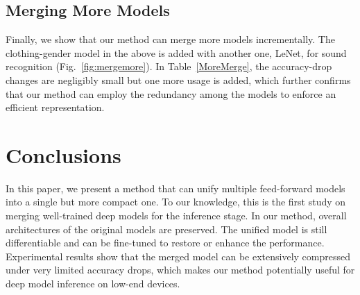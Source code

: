 \documentclass{article}
\begin{document}
	
	
	\subsection*{Merging More Models}
	Finally, we show that our method can merge more models incrementally.
	The clothing-gender model in the above is added with another one, LeNet, for sound recognition (Fig.~\ref{fig:mergemore}).
	In Table~\ref{MoreMerge}, the accuracy-drop changes are negligibly small %
	but one more usage is added, which further confirms that our method can employ the redundancy among the models to enforce an efficient representation.
	
	
	
	\section{Conclusions}
	In this paper, we present a method that can unify multiple feed-forward models into a single but more compact one.
	To our knowledge, this is the first study on merging well-trained deep models for the inference stage. In our method, overall architectures of the original models are preserved.
	The unified model is still differentiable and can be fine-tuned to restore or enhance the performance. Experimental results show that the merged model can be extensively compressed under very limited accuracy drops, which makes our method potentially useful for deep model inference on low-end devices.
	
\end{document}
